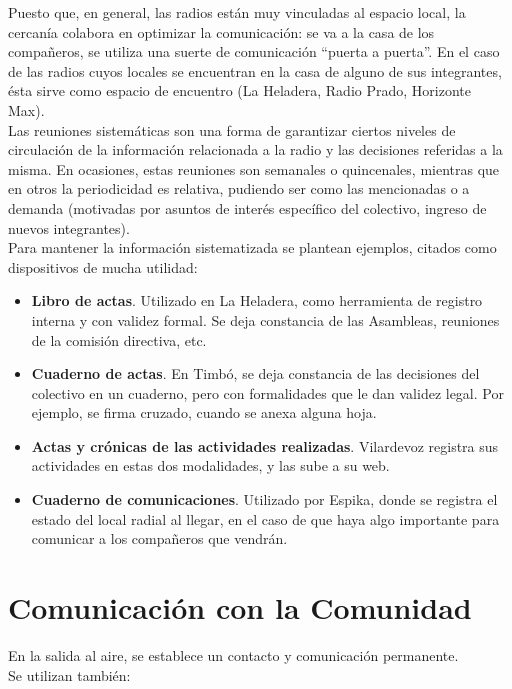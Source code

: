 Puesto que, en general, las radios están muy vinculadas al espacio local, la cercanía colabora en optimizar la comunicación: se va a la casa de los compañeros, se utiliza una suerte de comunicación “puerta a puerta”. En el caso de las radios cuyos locales se encuentran en la casa de alguno de sus integrantes, ésta sirve como espacio de encuentro (La Heladera, Radio Prado, Horizonte Max).\\

Las reuniones sistemáticas son una forma de garantizar ciertos niveles de circulación de la información relacionada a la radio y las decisiones referidas a la misma. En ocasiones, estas reuniones son semanales o quincenales, mientras que en otros la periodicidad es relativa, pudiendo ser como las mencionadas o a demanda (motivadas por asuntos de interés específico del colectivo, ingreso de nuevos integrantes).\\

Para mantener la información sistematizada se plantean ejemplos, citados como dispositivos de mucha utilidad:

\begin{itemize}
 \item \textbf{Libro de actas}. Utilizado en La Heladera, como herramienta de registro interna y con validez formal. Se deja constancia de las Asambleas, reuniones de la comisión directiva, etc.
 \item \textbf{Cuaderno de actas}. En Timbó, se deja constancia de las decisiones del colectivo en un cuaderno, pero con formalidades que le dan validez legal. Por ejemplo, se firma cruzado, cuando se anexa alguna hoja.
 \item \textbf{Actas y crónicas de las actividades realizadas}. Vilardevoz registra sus actividades en estas dos modalidades, y las sube a su web.
 \item \textbf{Cuaderno de comunicaciones}. Utilizado por Espika, donde se registra el estado del local radial al llegar, en el caso de que haya algo importante para comunicar a los compañeros que vendrán.
\end{itemize}

\section{Comunicación con la Comunidad}
En la salida al aire, se establece un contacto y comunicación permanente.\\

Se utilizan también:\\

